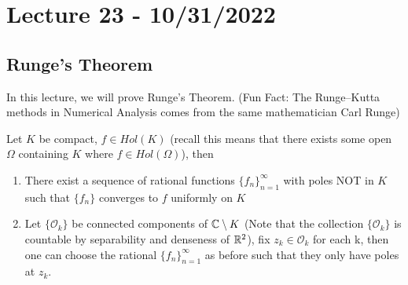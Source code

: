 \section{Lecture 23 - 10/31/2022}

\subsection{Runge's Theorem}

In this lecture, we will prove Runge's Theorem. (Fun Fact: The Runge–Kutta methods in Numerical Analysis comes from the same mathematician Carl Runge)

\begin{theorem}
    Let $K$ be compact, $f \in Hol(K)$ (recall this means that there exists some open $\Omega$ containing $K$ where $f \in Hol(\Omega)$), then
    \begin{enumerate}
        \item There exist a sequence of rational functions $\{f_n\}_{n = 1}^\infty$ with poles NOT in $K$ such that $\{f_n\}$ converges to $f$ uniformly on $K$
        \item Let $\{\mathcal{O}_k\}$ be connected components of $\mathbb{C} \setminus K$ (Note that the collection $\{\mathcal{O}_k\}$ is countable by separability and denseness of $\mathbb{R}^2$), fix $z_k \in \mathcal{O}_k$ for each k, then one can choose the rational $\{f_n\}_{n = 1}^\infty$ as before such that they only have poles at $z_k$.
    \end{enumerate}
\end{theorem}

